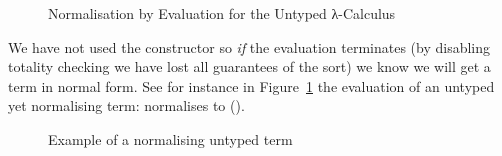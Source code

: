 \begin{figure}[h]
\caption{Normalisation by Evaluation for the Untyped λ-Calculus}
\end{figure}

We have not used the  constructor so \emph{if} the evaluation terminates
(by disabling totality checking we have lost all guarantees of the sort) we know
we will get a term in normal form. See for instance in
Figure~\ref{fig:normuntyped} the evaluation of an untyped yet normalising
term: {}
normalises to {()}.

\begin{figure}[h]
\caption{Example of a normalising untyped term}
\label{fig:normuntyped}
\end{figure}
